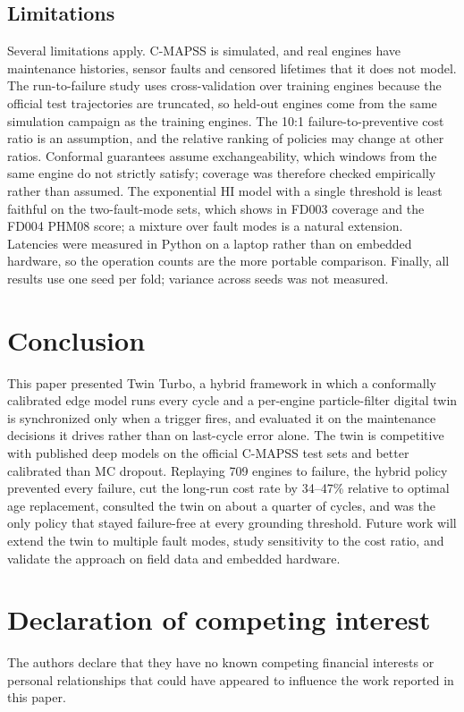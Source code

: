 \documentclass[preprint,12pt,authoryear]{elsarticle}
\begin{document}
\subsection{Limitations}
Several limitations apply. C-MAPSS is simulated, and real engines have maintenance histories, sensor faults and censored lifetimes that it does not model. The run-to-failure study uses cross-validation over training engines because the official test trajectories are truncated, so held-out engines come from the same simulation campaign as the training engines. The 10:1 failure-to-preventive cost ratio is an assumption, and the relative ranking of policies may change at other ratios. Conformal guarantees assume exchangeability, which windows from the same engine do not strictly satisfy; coverage was therefore checked empirically rather than assumed. The exponential HI model with a single threshold is least faithful on the two-fault-mode sets, which shows in FD003 coverage and the FD004 PHM08 score; a mixture over fault modes is a natural extension. Latencies were measured in Python on a laptop rather than on embedded hardware, so the operation counts are the more portable comparison. Finally, all results use one seed per fold; variance across seeds was not measured.

\section{Conclusion}\label{sec:conclusion}

This paper presented Twin Turbo, a hybrid framework in which a conformally calibrated edge model runs every cycle and a per-engine particle-filter digital twin is synchronized only when a trigger fires, and evaluated it on the maintenance decisions it drives rather than on last-cycle error alone. The twin is competitive with published deep models on the official C-MAPSS test sets and better calibrated than MC dropout. Replaying 709 engines to failure, the hybrid policy prevented every failure, cut the long-run cost rate by 34--47\% relative to optimal age replacement, consulted the twin on about a quarter of cycles, and was the only policy that stayed failure-free at every grounding threshold. Future work will extend the twin to multiple fault modes, study sensitivity to the cost ratio, and validate the approach on field data and embedded hardware.


\section*{Declaration of competing interest}
The authors declare that they have no known competing financial interests or personal relationships that could have appeared to influence the work reported in this paper.
\end{document}
